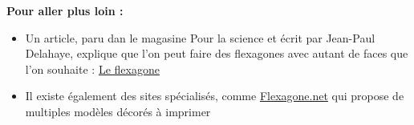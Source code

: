 \begin{enigme}[Le flexagone]
\begin{enumerate}
       \end{enumerate}
    \vspace*{-4mm}
   {\bf Pour aller plus loin :}
   \begin{itemize}
       \item Un article, paru dan le magasine \og Pour la science \fg{} et écrit par Jean-Paul Delahaye, explique que l'on peut faire des flexagones avec autant de faces que l'on souhaite : \href{https://www.cristal.univ-lille.fr/~jdelahay/pls/2005/131.pdf}{\blue Le flexagone}
       \item Il existe également des sites spécialisés, comme \href{http://www.flexagon.net}{\blue Flexagone.net} qui propose de multiples modèles décorés à imprimer 
    \end{itemize}
 \end{enigme}
 
